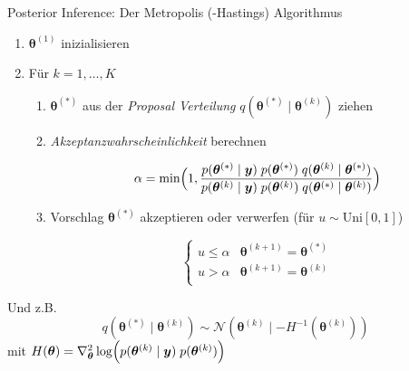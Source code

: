 \documentclass[
  ignorenonframetext,
  aspectratio=169,
]{beamer}
\providecommand{\tightlist}{%
  \setlength{\itemsep}{0pt}\setlength{\parskip}{0pt}}
\newcommand{\by}{\bm{y}}
\newcommand{\Ncal}{\mathcal{N}}
\newcommand{\btheta}{\bm{\theta}}
\begin{document}
\begin{frame}{Posterior Inference: Der Metropolis (-Hastings)
Algorithmus}
\protect{}\label{posterior-inference-der-metropolis--hastings-algorithmus}
\begin{enumerate}
\tightlist
\item
  \(\btheta^{(1)}\) inizialisieren
\item
  Für \(k = 1, \dots, K\)

  \begin{enumerate}
  \item
    \(\btheta^{(*)}\) aus der \textit{Proposal Verteilung}
    \(q(\btheta^{(*)} \mid \btheta^{(k)})\) ziehen
  \item
    \textit{Akzeptanzwahrscheinlichkeit} berechnen

    \[
         \alpha = \min \Bigl(
             1, \frac{
                 p(\btheta^{(*)} \mid \by)\; p(\btheta^{(*)}) \; q(\btheta^{(k)} \mid \btheta^{(*)})}{
                     p(\btheta^{(k)} \mid \by)\; p(\btheta^{(k)}) \; q(\btheta^{(*)} \mid \btheta^{(k)})
                 }
             \Bigr)
     \]
  \item
    Vorschlag \(\btheta^{(*)}\) akzeptieren oder verwerfen (für
    \(u \sim \text{Uni}[0, 1]\))

    \[
     \begin{cases}
             u \le \alpha & \btheta^{(k+1)} = \btheta^{(*)}\\
             u > \alpha & \btheta^{(k+1)} = \btheta^{(k)}\\
     \end{cases}
     \]
  \end{enumerate}
\end{enumerate}

Und z.B. \[
q(\btheta^{(*)} \mid \btheta^{(k)}) \sim \Ncal(\btheta^{(k)} \mid -H^{-1}(\btheta^{(k)}))
\] mit
\(H(\btheta) = \nabla_{\btheta}^2  \log \Bigl(p(\btheta^{(k)} \mid \by)\; p(\btheta^{(k)})\Bigr)\)
\end{frame}
\end{document}

